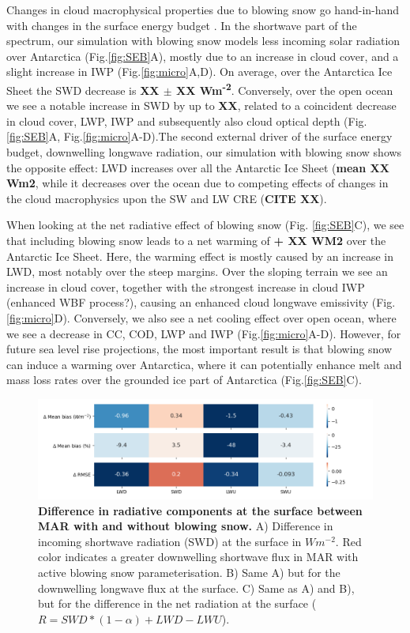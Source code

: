 \documentclass[12pt]{article}
\begin{document}
Changes in cloud macrophysical properties due to blowing snow go hand-in-hand with changes in the surface energy budget \cite{Hofer2019}. In the shortwave part of the spectrum, our simulation with blowing snow models less incoming solar radiation over Antarctica (Fig.\ref{fig:SEB}A), mostly due to an increase in cloud cover, and a slight increase in IWP (Fig.\ref{fig:micro}A,D). On average, over the Antarctica Ice Sheet the SWD decrease is \textbf{XX $\pm$ XX Wm\textsuperscript{-2}}. Conversely, over the open ocean we see a notable increase in SWD by up to \textbf{XX}, related to a coincident decrease in cloud cover, LWP, IWP and subsequently also cloud optical depth (Fig. \ref{fig:SEB}A, Fig.\ref{fig:micro}A-D).The second external driver of the surface energy budget, downwelling longwave radiation, our simulation with blowing snow shows the opposite effect: LWD increases over all the Antarctic Ice Sheet (\textbf{mean XX Wm2}, while it decreases over the ocean due to competing effects of changes in the cloud macrophysics upon the SW and LW CRE (\textbf{CITE XX}).

When looking at the net radiative effect of blowing snow (Fig. \ref{fig:SEB}C), we see that including blowing snow leads to a net warming of \textbf{+ XX WM2} over the Antarctic Ice Sheet. Here, the warming effect is mostly caused by an increase in LWD, most notably over the steep margins. Over the sloping terrain we see an increase in cloud cover, together with the strongest increase in cloud IWP (enhanced WBF process?), causing an enhanced cloud longwave emissivity (Fig. \ref{fig:micro}D). Conversely, we also see a net cooling effect over open ocean, where we see a decrease in CC, COD, LWP and IWP (Fig.\ref{fig:micro}A-D). However, for future sea level rise projections, the most important result is that blowing snow can induce a warming over Antarctica, where it can potentially enhance melt and mass loss rates over the grounded ice part of Antarctica (Fig.\ref{fig:SEB}C).

\begin{figure}[H]
	\includegraphics[scale=0.7,center]{heatmap.png}
	\caption{\textbf{Difference in radiative components at the surface between MAR with and without blowing snow.} A) Difference in incoming shortwave radiation (SWD) at the surface in $Wm^{-2}$. Red color indicates a greater downwelling shortwave flux in MAR with active blowing snow parameterisation. B) Same A) but for the downwelling longwave flux at the surface. C) Same as A) and B), but for the difference in the net radiation at the surface ($R= SWD * (1 - \alpha) + LWD - LWU$).}
	\label{fig:heat}
\end{figure}
\end{document}
